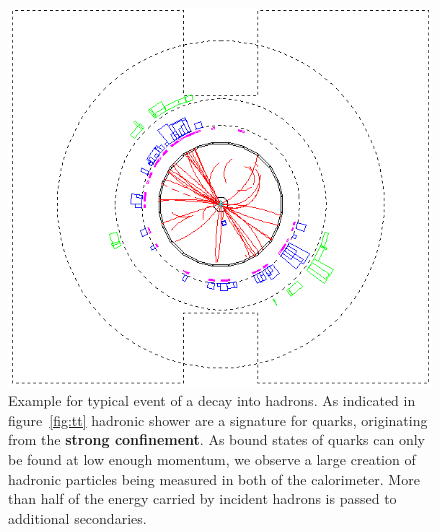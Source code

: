 \begin{figure}[htpb]
    \centering
    \includegraphics[width=0.8\linewidth]{figures/qq_02.png}
    \caption{Example for typical event of a decay into hadrons. As indicated in figure~\ref{fig:tt} hadronic shower are 
   a signature for quarks, originating from the \textbf{strong confinement}. 
   As bound states of quarks can only be found at low enough
   momentum, we observe a large creation of hadronic particles being
   measured in both of the calorimeter. More than half of
   the energy carried by incident hadrons is passed to additional secondaries. }
\label{fig:qq}
\end{figure}

\clearpage
